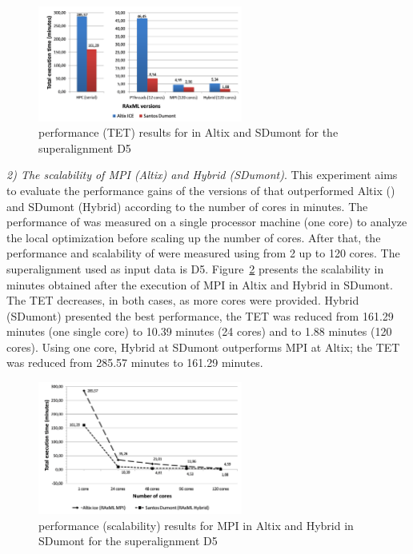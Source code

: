 \begin{figure}[!htb]
\centering
\includegraphics[width=0.6\textwidth]{imgs/raxmlTETD5.png}
\vspace{-12px}
\caption{\system performance (TET) results for \raxml in Altix and SDumont for the superalignment D5}
\label{fig:raxmlTETD5}
\end{figure}

\textit{2) The scalability of \raxml MPI (Altix) and \raxml Hybrid (SDumont)}. This experiment aims to evaluate the performance gains of the versions of \raxml that outperformed Altix (\raxml) and SDumont (\raxml Hybrid) according to the number of cores in minutes. The performance of \raxml was measured on a single processor machine (one core) to analyze the local optimization before scaling up the number of cores. After that, the performance and scalability of \raxml were measured using from 2 up to 120 cores. The superalignment used as input data is D5. Figure~\ref{fig:raxmlscalabilityD5} presents the scalability in minutes obtained after the execution of \raxml MPI in Altix and \raxml Hybrid in SDumont. The TET decreases, in both cases, as more cores were provided. \raxml Hybrid (SDumont) presented the best performance, the TET was reduced from 161.29 minutes (one single core) to 10.39 minutes (24 cores) and to 1.88 minutes (120 cores). Using one core, \raxml Hybrid at SDumont outperforms \raxml MPI at Altix; the TET was reduced from 285.57 minutes to 161.29 minutes.

\begin{figure}[!htb]
\centering
\includegraphics[width=0.6\textwidth]{imgs/raxmlscalabilityD5.png}
\vspace{-12px}
\caption{\system performance (scalability) results for \raxml MPI in Altix and \raxml Hybrid in SDumont for the superalignment D5}
\label{fig:raxmlscalabilityD5}
\end{figure}

